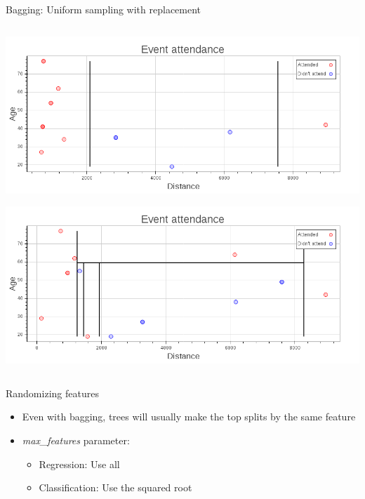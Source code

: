 \begin{frame}[fragile]{Bagging: Uniform sampling with replacement}
\begin{columns}
     \begin{column}{.49\textwidth}
        \begin{center}
            \includegraphics[scale=.18]{images/bagging3}
        \end{center}
        \newline{}
        \begin{center}
            \includegraphics[scale=.18]{images/bagging4}
        \end{center}
     \end{column}
    \end{columns}
\end{frame}

\begin{frame}{Randomizing features}
    \begin{itemize}
        \item Even with bagging, trees will usually make the top splits by the same feature
        \item \emph{max\_features} parameter:
        \begin{itemize}
            \item Regression: Use all
            \item Classification: Use the squared root
        \end{itemize}
    \end{itemize}

\end{frame}

